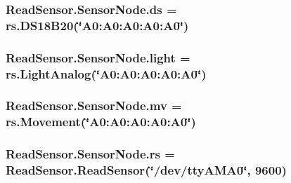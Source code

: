 \subsubsection[{\texorpdfstring{ds}{ds}}]{\setlength{\rightskip}{0pt plus 5cm}Read\+Sensor.\+Sensor\+Node.\+ds = rs.\+D\+S18\+B20(\char`\"{}A0\+:\+A0\+:\+A0\+:\+A0\+:\+A0\char`\"{})}\hypertarget{namespaceReadSensor_1_1SensorNode_a8171a151bb4b0ae935ff538ce6791944}{}\label{namespaceReadSensor_1_1SensorNode_a8171a151bb4b0ae935ff538ce6791944}
\subsubsection[{\texorpdfstring{light}{light}}]{\setlength{\rightskip}{0pt plus 5cm}Read\+Sensor.\+Sensor\+Node.\+light = rs.\+Light\+Analog(\char`\"{}A0\+:\+A0\+:\+A0\+:\+A0\+:\+A0\char`\"{})}\hypertarget{namespaceReadSensor_1_1SensorNode_aaf373686eec11b55f9271c70d083bd70}{}\label{namespaceReadSensor_1_1SensorNode_aaf373686eec11b55f9271c70d083bd70}
\subsubsection[{\texorpdfstring{mv}{mv}}]{\setlength{\rightskip}{0pt plus 5cm}Read\+Sensor.\+Sensor\+Node.\+mv = rs.\+Movement(\char`\"{}A0\+:\+A0\+:\+A0\+:\+A0\+:\+A0\char`\"{})}\hypertarget{namespaceReadSensor_1_1SensorNode_a6554f3410cedc47453c44dffec450d82}{}\label{namespaceReadSensor_1_1SensorNode_a6554f3410cedc47453c44dffec450d82}
\subsubsection[{\texorpdfstring{rs}{rs}}]{\setlength{\rightskip}{0pt plus 5cm}Read\+Sensor.\+Sensor\+Node.\+rs = {\bf Read\+Sensor.\+Read\+Sensor}(\char`\"{}/dev/tty\+A\+M\+A0\char`\"{}, 9600)}\hypertarget{namespaceReadSensor_1_1SensorNode_aab4130f05e0d383004da4b2199def54d}{}\label{namespaceReadSensor_1_1SensorNode_aab4130f05e0d383004da4b2199def54d}
